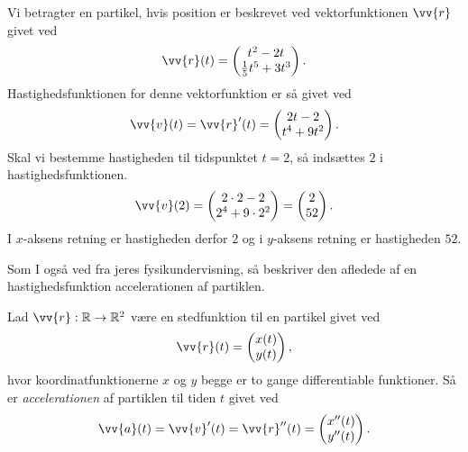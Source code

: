 \begin{exa}\label{exa:exa1}
	Vi betragter en partikel, hvis position er beskrevet ved vektorfunktionen $\vv{r}$ givet ved
	\begin{align*}
		\vv{r}(t) = 
		\begin{pmatrix}
			t^2-2t \\
			\frac{1}{5}t^5+3t^3
		\end{pmatrix}.
	\end{align*}
	Hastighedsfunktionen for denne vektorfunktion er så givet ved
	\begin{align*}
		\vv{v}(t) = \vv{r}'(t) = 
		\begin{pmatrix}
			2t-2 \\
			t^4+9t^2
		\end{pmatrix}.
	\end{align*}
	Skal vi bestemme hastigheden til tidspunktet $t=2$, så indsættes $2$ i hastighedsfunktionen. 
	\begin{align*}
		\vv{v}(2) = 
		\begin{pmatrix}
			2\cdot 2 - 2 \\
			2^4+9\cdot 2^2
		\end{pmatrix} = 
		\begin{pmatrix}
			2 \\
			52
		\end{pmatrix}.
	\end{align*}
	I $x$-aksens retning er hastigheden derfor $2$ og i $y$-aksens retning er hastigheden $52$. 
\end{exa}
Som I også ved fra jeres fysikundervisning, så beskriver den afledede af en hastighedsfunktion accelerationen af partiklen. 
\begin{defn}[Acceleration]
Lad $\vv{r}:\mathbb{R} \to \mathbb{R}^2$ være en stedfunktion til en partikel givet ved
\begin{align*}
	\vv{r}(t) = 
	\begin{pmatrix}
		x(t) \\
		y(t)
	\end{pmatrix},
\end{align*}
hvor koordinatfunktionerne $x$ og $y$ begge er to gange differentiable funktioner. Så er \textit{accelerationen} af partiklen til tiden $t$ givet ved
\begin{align*}
	\vv{a}(t) = \vv{v}'(t) = \vv{r}''(t) = 
	\begin{pmatrix}
		x''(t) \\
		y''(t)
	\end{pmatrix}.
\end{align*}
\end{defn}

